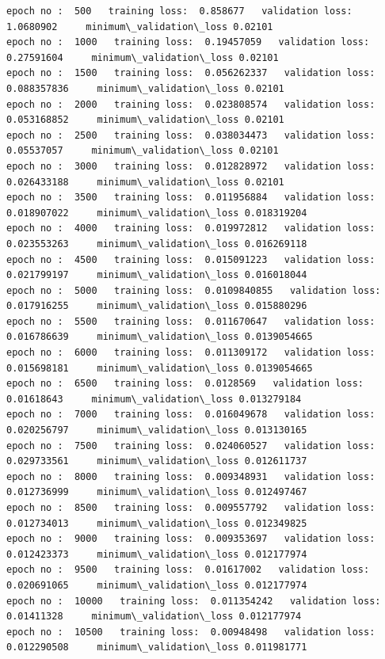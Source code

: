 \documentclass[11pt, a4paper , landscape]{article}
\begin{document}
    \begin{Verbatim}[commandchars=\\\{\}]
epoch no :  500   training loss:  0.858677   validation loss:  1.0680902     minimum\_validation\_loss 0.02101
epoch no :  1000   training loss:  0.19457059   validation loss:  0.27591604     minimum\_validation\_loss 0.02101
epoch no :  1500   training loss:  0.056262337   validation loss:  0.088357836     minimum\_validation\_loss 0.02101
epoch no :  2000   training loss:  0.023808574   validation loss:  0.053168852     minimum\_validation\_loss 0.02101
epoch no :  2500   training loss:  0.038034473   validation loss:  0.05537057     minimum\_validation\_loss 0.02101
epoch no :  3000   training loss:  0.012828972   validation loss:  0.026433188     minimum\_validation\_loss 0.02101
epoch no :  3500   training loss:  0.011956884   validation loss:  0.018907022     minimum\_validation\_loss 0.018319204
epoch no :  4000   training loss:  0.019972812   validation loss:  0.023553263     minimum\_validation\_loss 0.016269118
epoch no :  4500   training loss:  0.015091223   validation loss:  0.021799197     minimum\_validation\_loss 0.016018044
epoch no :  5000   training loss:  0.0109840855   validation loss:  0.017916255     minimum\_validation\_loss 0.015880296
epoch no :  5500   training loss:  0.011670647   validation loss:  0.016786639     minimum\_validation\_loss 0.0139054665
epoch no :  6000   training loss:  0.011309172   validation loss:  0.015698181     minimum\_validation\_loss 0.0139054665
epoch no :  6500   training loss:  0.0128569   validation loss:  0.01618643     minimum\_validation\_loss 0.013279184
epoch no :  7000   training loss:  0.016049678   validation loss:  0.020256797     minimum\_validation\_loss 0.013130165
epoch no :  7500   training loss:  0.024060527   validation loss:  0.029733561     minimum\_validation\_loss 0.012611737
epoch no :  8000   training loss:  0.009348931   validation loss:  0.012736999     minimum\_validation\_loss 0.012497467
epoch no :  8500   training loss:  0.009557792   validation loss:  0.012734013     minimum\_validation\_loss 0.012349825
epoch no :  9000   training loss:  0.009353697   validation loss:  0.012423373     minimum\_validation\_loss 0.012177974
epoch no :  9500   training loss:  0.01617002   validation loss:  0.020691065     minimum\_validation\_loss 0.012177974
epoch no :  10000   training loss:  0.011354242   validation loss:  0.01411328     minimum\_validation\_loss 0.012177974
epoch no :  10500   training loss:  0.00948498   validation loss:  0.012290508     minimum\_validation\_loss 0.011981771

\end{Verbatim}
\end{document}
